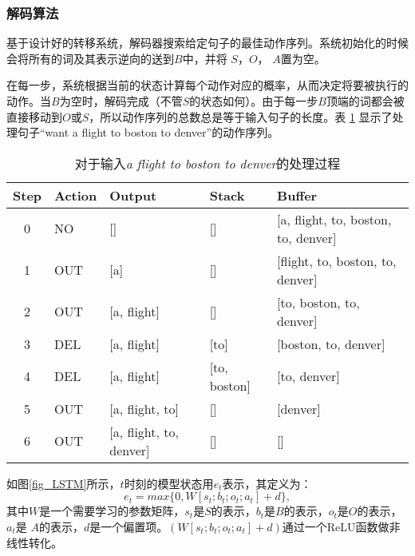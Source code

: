 \subsubsection*{解码算法}
基于设计好的转移系统，解码器搜索给定句子的最佳动作序列。系统初始化的时候会将所有的词及其表示逆向的送到$B$中，并将 $S$，$O$， $A$置为空。

在每一步，系统根据当前的状态计算每个动作对应的概率，从而决定将要被执行的动作。当$B$为空时，解码完成（不管$S$的状态如何）。由于每一步$B$顶端的词都会被直接移动到$O$或$S$，所以动作序列的总数总是等于输入句子的长度。表 
\ref{action_sample}
显示了处理句子“want a flight to boston to denver”的动作序列。
\begin{table}[htbp]
	\caption{对于输入\emph{a flight to boston to denver}的处理过程}
	\label{action_sample}
	\vspace{-0.5em}
	\centering
	\begin{tabular}{c l l l l }
		\hline
		Step & Action &  Output & Stack & Buffer   \\
		\hline\hline
		0 & NO& [] & [] & [a, flight, to, boston, to, denver]  \\
		1 & OUT & [a] & [] & [flight, to, boston, to, denver]  \\
		2 & OUT & [a, flight] & [] & [to, boston, to, denver]   \\
		3 & DEL & [a, flight] & [to] & [boston, to, denver]   \\
		4 & DEL & [a, flight] & [to, boston] & [to, denver]   \\
		5 & OUT & [a, flight, to] & [] & [denver]  \\
		6 & OUT & [a, flight, to, denver] & [] & []  \\
		\hline
	\end{tabular}
\end{table}


  如图\ref{fig_LSTM}所示，$t$时刻的模型状态用$e_t$表示，其定义为：
  \begin{equation}
  e_t = max \{ 0, W[s_t; b_t; o_t; a_t] + d \} ,\nonumber
  \end{equation}
  其中$W$是一个需要学习的参数矩阵，$s_t$是$S$的表示，$b_t$是$B$的表示，$o_t$是$O$的表示，$a_t$是 $A$的表示，$d$是一个偏置项。$(W[s_t; b_t; o_t; a_t] + d)$通过一个ReLU函数做非线性转化。
  

